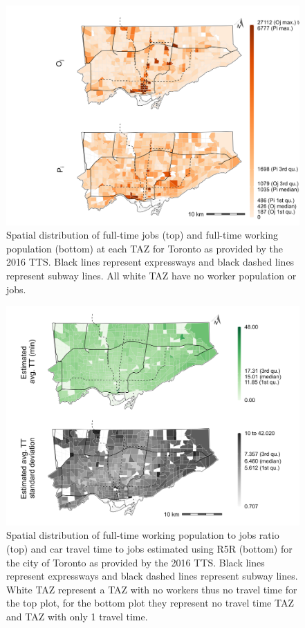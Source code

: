 \documentclass[]{elsarticle} %
\begin{document}
\begin{figure}
\includegraphics[width=1\linewidth]{images/spatial-dist-jobs-pop-Toronto-plot} \caption{\label{fig:s-dist-Toronto-plot}  Spatial distribution of full-time jobs (top) and full-time working population (bottom) at each TAZ for Toronto as provided by the 2016 TTS. Black lines represent expressways and black dashed lines represent subway lines. All white TAZ have no worker population or jobs.}\label{fig:spatial-dist-Toronto-plot}
\end{figure}

\begin{figure}
\includegraphics[width=1\linewidth]{images/spatial-dist-jobs-pop-Toronto-plot2} \caption{\label{fig:s-dist-Toronto-plot2}  Spatial distribution of full-time working population to jobs ratio (top) and car travel time to jobs estimated using R5R (bottom) for the city of Toronto as provided by the 2016 TTS. Black lines represent expressways and black dashed lines represent subway lines. White TAZ represent a TAZ with no workers thus no travel time for the top plot, for the bottom plot they represent no travel time TAZ and TAZ with only 1 travel time.}\label{fig:spatial-dist-Toronto-plot2}
\end{figure}
\end{document}
